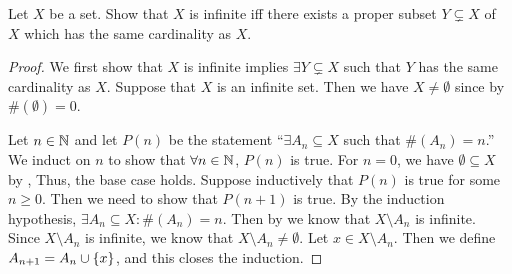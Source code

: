 \exercisesection

\begin{ex}\label{i:ex:8.1.1}
  Let \(X\) be a set.
  Show that \(X\) is infinite iff there exists a proper subset \(Y \subsetneq X\) of \(X\) which has the same cardinality as \(X\).
\end{ex}

\begin{proof}
  We first show that \(X\) is infinite implies \(\exists Y \subsetneq X\) such that \(Y\) has the same cardinality as \(X\).
  Suppose that \(X\) is an infinite set.
  Then we have \(X \neq \emptyset\) since by  \(\#(\emptyset) = 0\).

  Let \(n \in \mathbb{N}\) and let \(P(n)\) be the statement ``\(\exists A_n \subseteq X\) such that \(\#(A_n) = n\).''
  We induct on \(n\) to show that \(\forall n \in \mathbb{N}\), \(P(n)\) is true.
  For \(n = 0\), we have \(\emptyset \subseteq X\) by , Thus, the base case holds.
  Suppose inductively that \(P(n)\) is true for some \(n \geq 0\).
  Then we need to show that \(P(n + 1)\) is true.
  By the induction hypothesis, \(\exists A_n \subseteq X : \#(A_n) = n\).
  Then by  we know that \(X \setminus A_n\) is infinite.
  Since \(X \setminus A_n\) is infinite, we know that \(X \setminus A_n \neq \emptyset\).
  Let \(x \in X \setminus A_n\).
  Then we define \(A_{n + 1} = A_n \cup \left\lbrace x\right\rbrace\), and this closes the induction.


\end{proof}
